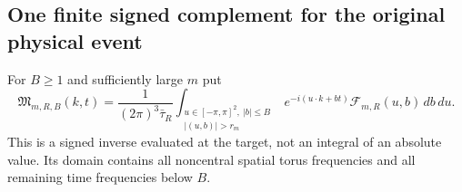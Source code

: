 \subsection{One finite signed complement for the original physical event}
For $B\ge1$ and sufficiently large $m$ put
\begin{equation}\label{eq:stationary-middle-complement}
 \mathfrak M_{m,R,B}(k,t)
 =\frac1{(2\pi)^3\bar\tau_R}
 \int_{\substack{u\in[-\pi,\pi]^2,\ |b|\le B\\ |(u,b)|>r_m}}
 e^{-i(u\cdot k+bt)}\mathcal F_{m,R}(u,b)\,db\,du.
\end{equation}
This is a signed inverse evaluated at the target, not an integral of
an absolute value. Its domain contains all noncentral spatial torus
frequencies and all remaining time frequencies below $B$.

